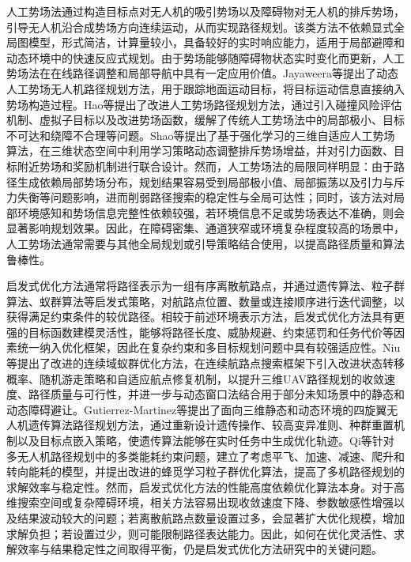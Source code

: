 人工势场法通过构造目标点对无人机的吸引势场以及障碍物对无人机的排斥势场，引导无人机沿合成势场方向连续运动，从而实现路径规划。该类方法不依赖显式全局图模型，形式简洁，计算量较小，具备较好的实时响应能力，适用于局部避障和动态环境中的快速反应式规划。由于势场能够随障碍物状态实时变化而更新，人工势场法在在线路径调整和局部导航中具有一定应用价值。Jayaweera等提出了动态人工势场无人机路径规划方法，用于跟踪地面运动目标，将目标运动信息直接纳入势场构造过程\cite{jayaweera2020dynamic}。Hao等提出了改进人工势场路径规划方法，通过引入碰撞风险评估机制、虚拟子目标以及改进势场函数，缓解了传统人工势场法中的局部极小、目标不可达和绕障不合理等问题\cite{hao2023uav}。Shao等提出了基于强化学习的三维自适应人工势场算法，在三维状态空间中利用学习策略动态调整排斥势场增益，并对引力函数、目标附近势场和奖励机制进行联合设计\cite{shao2025adaptive}。然而，人工势场法的局限同样明显：由于路径生成依赖局部势场分布，规划结果容易受到局部极小值、局部振荡以及引力与斥力失衡等问题影响，进而削弱路径搜索的稳定性与全局可达性；同时，该方法对局部环境感知和势场信息完整性依赖较强，若环境信息不足或势场表达不准确，则会显著影响规划效果。因此，在障碍密集、通道狭窄或环境复杂程度较高的场景中，人工势场法通常需要与其他全局规划或引导策略结合使用，以提高路径质量和算法鲁棒性。

启发式优化方法通常将路径表示为一组有序离散航路点，并通过遗传算法、粒子群算法、蚁群算法等启发式策略，对航路点位置、数量或连接顺序进行迭代调整，以获得满足约束条件的较优路径\cite{KZYC202205002}。相较于前述环境表示方法，启发式优化方法具有更强的目标函数建模灵活性，能够将路径长度、威胁规避、约束惩罚和任务代价等因素统一纳入优化框架，因此在复杂约束和多目标规划问题中具有较强适应性。Niu等提出了改进的连续域蚁群优化方法，在连续航路点搜索框架下引入改进状态转移概率、随机游走策略和自适应航点修复机制，以提升三维UAV路径规划的收敛速度、路径质量与可行性，并进一步与动态窗口法结合用于部分未知场景中的静态和动态障碍避让\cite{niu2025path}。Gutierrez-Martinez等提出了面向三维静态和动态环境的四旋翼无人机遗传算法路径规划方法，通过重新设计遗传操作、较高变异准则、种群重置机制以及目标点嵌入策略，使遗传算法能够在实时任务中生成优化轨迹\cite{gutierrezmartinez2025genetic}。Qi等针对多无人机路径规划中的多类能耗约束问题，建立了考虑平飞、加速、减速、爬升和转向能耗的模型，并提出改进的蜂觅学习粒子群优化算法，提高了多机路径规划的求解效率与稳定性\cite{qi2025multi}。然而，启发式优化方法的性能高度依赖优化算法本身。对于高维搜索空间或复杂障碍环境，相关方法容易出现收敛速度下降、参数敏感性增强以及结果波动较大的问题；若离散航路点数量设置过多，会显著扩大优化规模，增加求解负担；若设置过少，则可能限制路径表达能力。因此，如何在优化灵活性、求解效率与结果稳定性之间取得平衡，仍是启发式优化方法研究中的关键问题。

